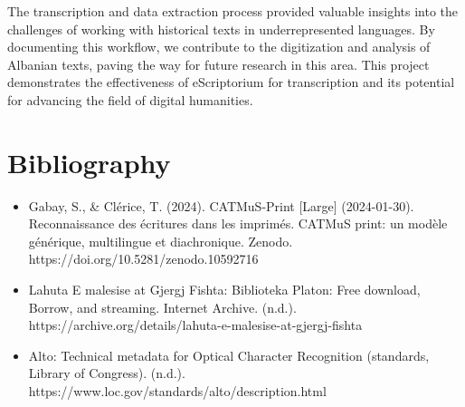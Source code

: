 \documentclass[12pt]{article}
\begin{document}
The transcription and data extraction process provided valuable insights into the challenges of working with historical texts in underrepresented languages. By documenting this workflow, we contribute to the digitization and analysis of Albanian texts, paving the way for future research in this area. This project demonstrates the effectiveness of eScriptorium for transcription and its potential for advancing the field of digital humanities.

\newpage

\section*{Bibliography}
\begin{itemize}
    \item Gabay, S., \& Clérice, T. (2024). CATMuS-Print [Large] (2024-01-30). Reconnaissance des écritures dans les imprimés. CATMuS print: un modèle générique, multilingue et diachronique. Zenodo. https://doi.org/10.5281/zenodo.10592716
    \item Lahuta E malesise at Gjergj Fishta: Biblioteka Platon: Free download, Borrow, and streaming. Internet Archive. (n.d.). https://archive.org/details/lahuta-e-malesise-at-gjergj-fishta 
    \item Alto: Technical metadata for Optical Character Recognition (standards, Library of Congress). (n.d.). https://www.loc.gov/standards/alto/description.html 
\end{itemize}
\end{document}
